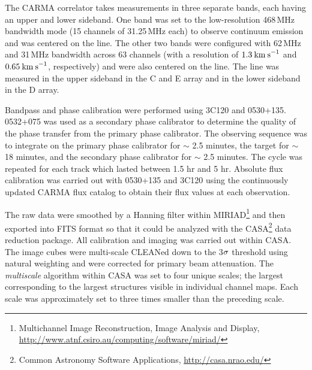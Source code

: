 \documentclass[iop]{emulateapj}
\begin{document}
The CARMA correlator takes measurements in three separate bands, each having an upper and lower sideband. One band was set to the low-resolution 468\,MHz bandwidth mode (15 channels of 31.25\,MHz each) to observe continuum emission and was centered on the line. The other two bands were configured with 62\,MHz and 31\,MHz bandwidth across 63 channels (with a resolution of $1.3\>{\rm km\>s}^{-1}$ and $0.65\>{\rm km\>s}^{-1}$, respectively) and were also centered on the line. The line was measured in the upper sideband in the C and E array and in the lower sideband in the D array.

Bandpass and phase calibration were performed using 3C120 and 0530+135. 0532+075 was used as a secondary phase calibrator to determine the quality of the phase transfer from the primary phase calibrator. The observing sequence was to integrate on the primary phase calibrator for $\sim$ 2.5 minutes, the target for $\sim$ 18 minutes, and the secondary phase calibrator for $\sim$ 2.5 minutes. The cycle was repeated for each track which lasted between 1.5 hr and 5 hr. Absolute flux calibration was carried out with 0530+135 and 3C120 using the continuously updated CARMA flux catalog to obtain their flux values at each observation.

The raw data were smoothed by a Hanning filter within MIRIAD\footnote{Multichannel Image Reconstruction, Image Analysis and Display, \url{http://www.atnf.csiro.au/computing/software/miriad/}} and then exported into FITS format so that it could be analyzed with the CASA\footnote{Common Astronomy Software Applications, \url{http://casa.nrao.edu/}} data reduction package. All calibration and imaging was carried out within CASA. The image cubes  were multi-scale  CLEANed down to the 3$\rm{\sigma}$ threshold using natural weighting and were corrected for primary beam attenuation. The \textit{multiscale} algorithm \citep{2008AJ....136.2897R} within CASA was set to four unique scales; the largest corresponding to the largest structures visible in individual channel maps. Each scale was approximately set to three times smaller than the preceding scale. 
\end{document}

